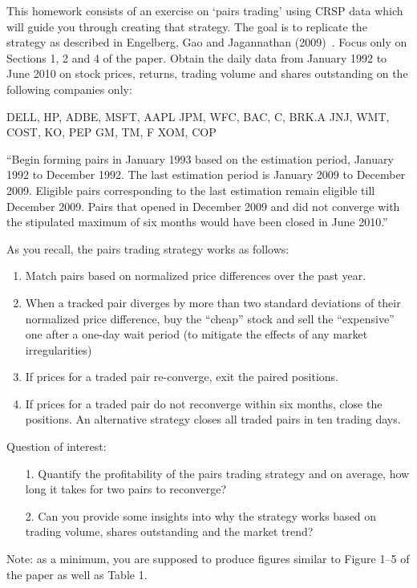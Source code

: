 \prob  This homework consists of an exercise on `pairs trading' using CRSP data which will guide you through creating that strategy. The goal is to replicate the strategy as described in Engelberg, Gao and Jagannathan (2009)~\cite{engelberg2009anatomy}. Focus only on Sections 1, 2 and 4 of the paper. Obtain the daily data from January 1992 to June 2010 on stock prices, returns, trading volume and shares outstanding on the following companies only:

\indent DELL, HP, ADBE, MSFT, AAPL\hfill \break
\indent JPM, WFC, BAC, C, BRK.A\hfill \break
\indent JNJ, WMT, COST, KO, PEP\hfill \break
\indent GM, TM, F\hfill \break
\indent XOM, COP 

``Begin forming pairs in January 1993 based on the estimation period, January 1992 to December 1992. The last estimation period is January 2009 to December 2009. Eligible pairs corresponding to the last estimation remain eligible till December 2009. Pairs that opened in December 2009 and did not converge with the stipulated maximum of six months would have been closed in June 2010.''

As you recall, the pairs trading strategy works as follows:
	\begin{enumerate}
	\item Match pairs based on normalized price differences over the past year.
	\item When a tracked pair diverges by more than two standard deviations of their normalized price difference, buy the ``cheap'' stock and sell the ``expensive'' one after a one-day wait period (to mitigate the effects of any market irregularities)
	\item If prices for a traded pair re-converge, exit the paired positions.
	\item If prices for a traded pair do not reconverge within six months, close the positions. An alternative strategy closes all traded pairs in ten trading days.
\end{enumerate}
Question of interest:
	\begin{enumerate}[(a)]
	\item[1.] Quantify the profitability of the pairs trading strategy and on average, how long it takes for two pairs to reconverge?
	\item[2.] Can you provide some insights into why the strategy works based on trading volume, shares outstanding and the market trend?
	\end{enumerate}
Note: as a minimum, you are supposed to produce figures similar to Figure 1--5 of the paper as well as Table 1. \\







